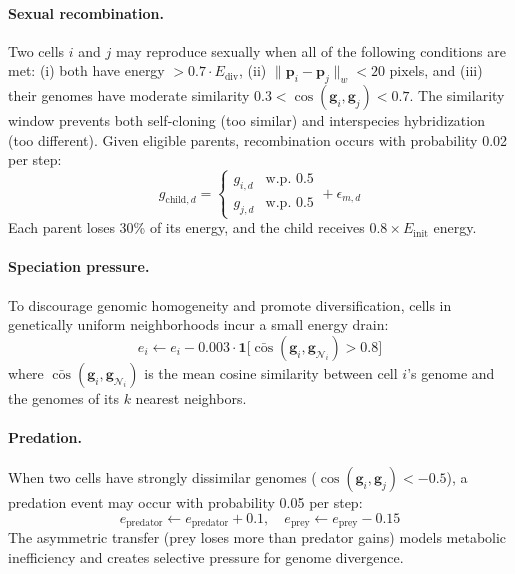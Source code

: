 \documentclass[10pt,twocolumn]{article}
\begin{document}
\paragraph{Sexual recombination.}
Two cells $i$ and $j$ may reproduce sexually when all of the following conditions are met: (i) both have energy $> 0.7 \cdot E_{\text{div}}$, (ii) $\|\mathbf{p}_i - \mathbf{p}_j\|_w < 20$ pixels, and (iii) their genomes have moderate similarity $0.3 < \cos(\mathbf{g}_i, \mathbf{g}_j) < 0.7$.
The similarity window prevents both self-cloning (too similar) and interspecies hybridization (too different).
Given eligible parents, recombination occurs with probability 0.02 per step:
\begin{equation}
  g_{\text{child},d} = \begin{cases}
    g_{i,d} & \text{w.p.\ } 0.5 \\
    g_{j,d} & \text{w.p.\ } 0.5
  \end{cases} + \epsilon_{m,d}
  \label{eq:sexual_genome}
\end{equation}
Each parent loses 30\% of its energy, and the child receives $0.8 \times E_{\text{init}}$ energy.

\paragraph{Speciation pressure.}
To discourage genomic homogeneity and promote diversification, cells in genetically uniform neighborhoods incur a small energy drain:
\begin{equation}
  e_i \leftarrow e_i - 0.003 \cdot \mathbf{1}\!\big[\bar{\cos}(\mathbf{g}_i, \mathbf{g}_{\mathcal{N}_i}) > 0.8\big]
  \label{eq:speciation}
\end{equation}
where $\bar{\cos}(\mathbf{g}_i, \mathbf{g}_{\mathcal{N}_i})$ is the mean cosine similarity between cell $i$'s genome and the genomes of its $k$ nearest neighbors.

\paragraph{Predation.}
When two cells have strongly dissimilar genomes ($\cos(\mathbf{g}_i, \mathbf{g}_j) < -0.5$), a predation event may occur with probability 0.05 per step:
\begin{equation}
  e_{\text{predator}} \leftarrow e_{\text{predator}} + 0.1, \quad e_{\text{prey}} \leftarrow e_{\text{prey}} - 0.15
  \label{eq:predation}
\end{equation}
The asymmetric transfer (prey loses more than predator gains) models metabolic inefficiency and creates selective pressure for genome divergence.
\end{document}
